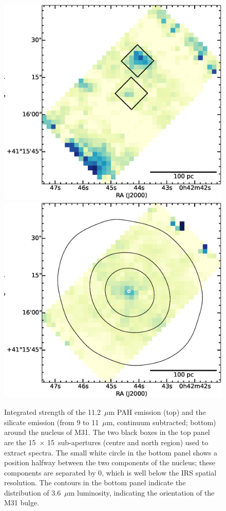 \label{sect:nucleus}


\begin{figure}
\centering
\includegraphics[scale = 0.25]{./fig10a.eps}
\includegraphics[scale = 0.25]{./fig10b.eps}
\caption{
Integrated strength of the 11.2~$\mu$m PAH emission (top) and the silicate emission (from 9 to 11~$\mu$m, continuum subtracted; bottom) 
around the nucleus of M31. 
The  two black boxes in the top panel are the 15\arcsec\ $\times$ 15\arcsec\ sub-apertures (centre and north region) used to extract spectra.  
The small white circle in the bottom panel shows a position halfway between the two components of the nucleus; these
components are separated by 0, which is well below the IRS spatial resolution. The contours in the bottom panel indicate
the distribution of 3.6~$\mu$m luminosity, indicating the orientation of the M31 bulge.
}
\label{nuc11}
\end{figure}

